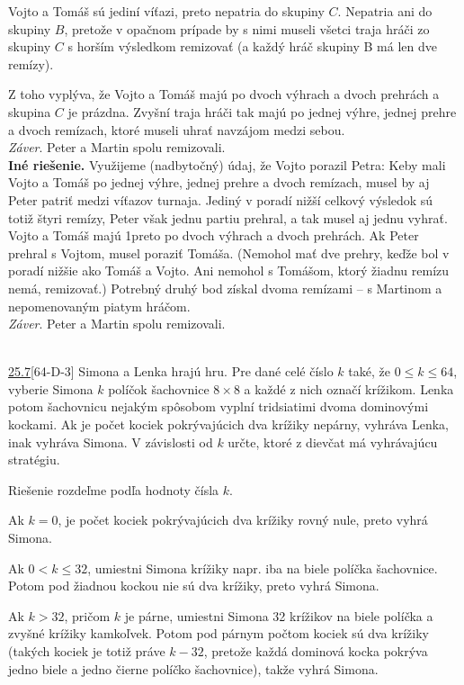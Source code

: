 Vojto a Tomáš sú jediní víťazi, preto nepatria do skupiny $C$. Nepatria ani do skupiny $B$, pretože v opačnom prípade by s nimi museli všetci traja hráči zo skupiny $C$ s horším výsledkom remizovať (a každý hráč skupiny B má len dve remízy).

Z toho vyplýva, že Vojto a Tomáš majú po dvoch výhrach a dvoch prehrách a skupina $C$ je prázdna. Zvyšní traja hráči tak majú po jednej výhre, jednej prehre a dvoch remízach, ktoré museli uhrať navzájom medzi sebou.\\
\textit{Záver}. Peter a Martin spolu remizovali.\\

\textbf{Iné riešenie.} Využijeme (nadbytočný) údaj, že Vojto porazil Petra: Keby mali Vojto a Tomáš po jednej výhre, jednej prehre a dvoch remízach, musel by aj Peter patriť medzi víťazov turnaja. Jediný v poradí nižší celkový výsledok sú totiž štyri remízy, Peter však jednu partiu prehral, a tak musel aj jednu vyhrať. Vojto a Tomáš majú 1preto po dvoch výhrach a dvoch prehrách. Ak Peter prehral s Vojtom, musel poraziť Tomáša. (Nemohol mať dve prehry, keďže bol v poradí nižšie ako Tomáš a Vojto. Ani nemohol s Tomášom, ktorý žiadnu remízu nemá, remizovať.) Potrebný druhý bod získal dvoma remízami -- s Martinom a nepomenovaným piatym hráčom.\\
\textit{Záver}. Peter a Martin spolu remizovali.\\
\\
\begin{tcolorbox}[breakable,notitle,boxrule=0pt,colback=light-gray,colframe=light-gray]\ul {25.7}[64-D-3] Simona a Lenka hrajú hru. Pre dané celé číslo $k$ také, že $0 \leq k \leq 64$, vyberie Simona $k$ políčok šachovnice $8 \times 8$ a každé z nich označí krížikom. Lenka potom šachovnicu nejakým spôsobom vyplní tridsiatimi dvoma dominovými kockami. Ak je počet kociek pokrývajúcich dva krížiky nepárny, vyhráva Lenka, inak vyhráva Simona. V závislosti
od $k$ určte, ktoré z dievčat má vyhrávajúcu stratégiu.

\end{tcolorbox}

\rieh Riešenie rozdeľme podľa hodnoty čísla $k$.

Ak $k = 0$, je počet kociek pokrývajúcich dva krížiky rovný nule, preto vyhrá Simona.

Ak $0 < k \leq 32$, umiestni Simona krížiky napr. iba na biele políčka šachovnice. Potom pod žiadnou kockou nie sú dva krížiky, preto vyhrá Simona.

Ak $k > 32$, pričom $k$ je párne, umiestni Simona 32 krížikov na biele políčka a zvyšné krížiky kamkoľvek. Potom pod párnym počtom kociek sú dva krížiky (takých kociek je totiž práve $k - 32$, pretože každá dominová kocka pokrýva jedno biele a jedno čierne
políčko šachovnice), takže vyhrá Simona.

